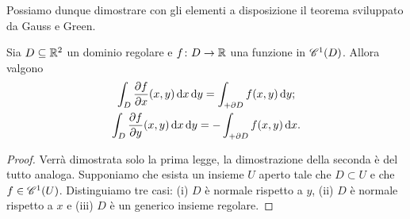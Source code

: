 Possiamo dunque dimostrare con gli elementi a disposizione il teorema sviluppato da Gauss e Green.
\begin{teorema} \label{t:gauss-green}
	Sia $D\subseteq\R^2$ un dominio regolare e $f\colon D\to\R$ una funzione in $\cont[1]{D}$.
	Allora valgono
	\begin{gather}
		\int_D\drp{f}{x}(x,y)\,\dd x\,\dd y=\int_{+\boundary D}f(x,y)\,\dd y;
		\label{eq:gauss-green-y}\\
		\int_D\drp{f}{y}(x,y)\,\dd x\,\dd y=-\int_{+\boundary D}f(x,y)\,\dd x.
		\label{eq:gauss-green-x}
	\end{gather}
\end{teorema}
\begin{proof}
	Verrà dimostrata solo la prima legge, la dimostrazione della seconda è del tutto analoga.
	Supponiamo che esista un insieme $U$ aperto tale che $D\subset U$ e che $f\in\cont[1]{U}$.
	Distinguiamo tre casi: (i) $D$ è normale rispetto a $y$, (ii) $D$ è normale rispetto a $x$ e (iii) $D$ è un generico insieme regolare.


\end{proof}
